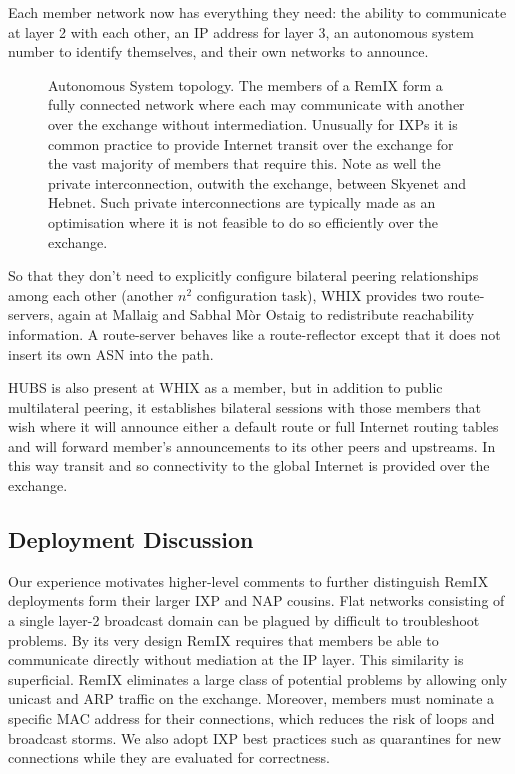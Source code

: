Each member network now has everything they need: the ability to
communicate at layer 2 with each other, an IP address for layer 3, an
autonomous system number to identify themselves, and their own
networks to announce.
\begin{figure}[h]
  \resizebox{\linewidth}{!}{
    \begin{tikzpicture}
      \whixtopodiagram
    \end{tikzpicture}
  }
  \caption{
  Autonomous System topology. The members of a RemIX form a fully
  connected network where each may communicate with another over the
  exchange without intermediation. Unusually for \acp{IXP} it is
  common practice to provide Internet transit over the exchange for
  the vast majority of members that require this. Note as well the
  private interconnection, outwith the exchange, between Skyenet and
  Hebnet. Such private interconnections are typically made as an
  optimisation where it is not feasible to do so efficiently over the
  exchange.}
\end{figure}
So that they don't need to explicitly configure bilateral peering
relationships among each other (another $n^2$ configuration
task), \ac{WHIX} provides two route-servers, again at Mallaig and
Sabhal M\`{o}r Ostaig to redistribute reachability information. A
route-server behaves like a route-reflector except that it does not
insert its own \ac{ASN} into the path.

HUBS is also present at \ac{WHIX} as a member, but in addition to
public multilateral peering, it establishes bilateral sessions with
those members that wish where it will announce either a default route
or full Internet routing tables and will forward member's
announcements to its other peers and upstreams. In this way transit
and so connectivity to the global Internet is provided over the
exchange.


\subsection{Deployment Discussion}

Our experience motivates higher-level comments to further distinguish RemIX
deployments form their larger \ac{IXP} and \ac{NAP} cousins. Flat networks
consisting of a single layer-2 broadcast domain can be plagued by difficult to
troubleshoot problems. By its very design RemIX requires that members be able to
communicate directly without mediation at the IP layer. This similarity is
superficial. RemIX eliminates a large class of potential problems by allowing
only unicast and \ac{ARP} traffic on the exchange. Moreover, members must
nominate a specific \ac{MAC} address for their connections, which reduces the
risk of loops and broadcast storms. We also adopt \ac{IXP} best practices such
as quarantines for new connections while they are evaluated for correctness.

